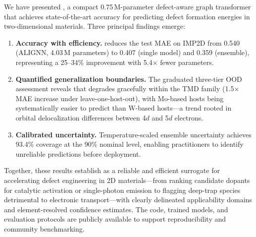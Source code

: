 
We have presented \dart{}, a compact 0.75\,M-parameter defect-aware graph
transformer that achieves state-of-the-art accuracy for predicting defect
formation energies in two-dimensional materials.
Three principal findings emerge:

\begin{enumerate}
  \item \textbf{Accuracy with efficiency.}
    \dart{} reduces the test MAE on IMP2D from 0.540\eV{} (ALIGNN, 4.03\,M
    parameters) to 0.407\eV{} (single model) and 0.359\eV{} (ensemble),
    representing a 25--34\% improvement with 5.4$\times$ fewer parameters.

  \item \textbf{Quantified generalization boundaries.}
    The graduated three-tier OOD assessment reveals that \dart{} degrades
    gracefully within the TMD family (1.5$\times$ MAE increase under
    leave-one-host-out), with Mo-based hosts being systematically easier to
    predict than W-based hosts---a trend rooted in orbital delocalization
    differences between 4$d$ and 5$d$ electrons.

  \item \textbf{Calibrated uncertainty.}
    Temperature-scaled ensemble uncertainty achieves 93.4\% coverage at the
    90\% nominal level, enabling practitioners to identify unreliable
    predictions before deployment.
\end{enumerate}

Together, these results establish \dart{} as a reliable and efficient
surrogate for accelerating defect engineering in 2D materials---from
ranking candidate dopants for catalytic activation or single-photon
emission to flagging deep-trap species detrimental to electronic
transport---with clearly delineated applicability domains and
element-resolved confidence estimates.
The code, trained models, and evaluation protocols are publicly available
to support reproducibility and community benchmarking.
